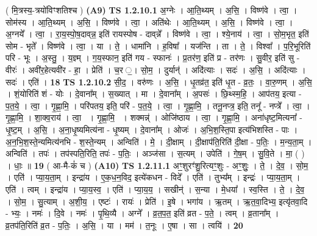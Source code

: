 \documentclass[17pt]{extarticle}
\begin{document}
                  \newline
                      ( मि॒त्रस्य॒-त्रयो॑विꣳशतिश्च )  \textbf{(A9)} \newline \newline
                                \textbf{ TS 1.2.10.1} \newline
                  अ॒ग्नेः । आ॒ति॒थ्यम् । अ॒सि॒ । विष्ण॑वे । त्वा॒ । सोम॑स्य । आ॒ति॒थ्यम् । अ॒सि॒ । विष्ण॑वे । त्वा॒ । अति॑थेः । आ॒ति॒थ्यम् । अ॒सि॒ । विष्ण॑वे । त्वा॒ । अ॒ग्नये᳚ । त्वा॒ । रा॒य॒स्पो॒ष॒दाव्‌न्न॒ इति॑ रायस्पोष - दाव्‌न्ने᳚ । विष्ण॑वे । त्वा॒ । श्ये॒नाय॑ । त्वा॒ । सो॒म॒भृत॒ इति॑ सोम - भृते᳚ । विष्ण॑वे । त्वा॒ । या । ते॒ । धामा॑नि । ह॒विषा᳚ । यज॑न्ति । ता । ते॒ । विश्वा᳚ । प॒रि॒भूरिति॑ परि - भूः । अ॒स्तु॒ । य॒ज्ञ्म् । ग॒य॒स्फान॒ इति॑ गय - स्फानः॑ । प्र॒तर॑ण॒ इति॑ प्र - तर॑णः । सु॒वीर॒ इति॑ सु - वीरः॑ । अवी॑र॒हेत्यवी॑र - हा॒ । प्रेति॑ । च॒र ॒। सो॒म॒ । दुर्यान्॑ । अदि॑त्याः । सदः॑ । अ॒सि॒ । अदि॑त्याः । सदः॑ । एति॑ । \textbf{  18} \newline
                  \newline
                                \textbf{ TS 1.2.10.2} \newline
                  सी॒द॒ । वरु॑णः । अ॒सि॒ । धृ॒तव्र॑त॒ इति॑ धृ॒त - व्र॒तः॒ । वा॒रु॒णम् । अ॒सि॒ । शं॒योरिति॑ शं - योः । दे॒वाना᳚म् । स॒ख्यात् । मा । दे॒वाना᳚म् । अ॒पसः॑ । छि॒थ्स्म॒हि॒ । आप॑तय॒ इत्या - प॒त॒ये॒ । त्वा॒ ।  गृ॒ह्णा॒मि॒ । परि॑पतय॒ इति॒ परि॑ - प॒त॒ये॒ । त्वा॒ । गृ॒ह्णा॒मि॒ । तनू॒नप्त्र॒ इति॒ तनू᳚ - नप्त्रे᳚ । त्वा॒ । गृ॒ह्णा॒मि॒ । शा॒क्व॒राय॑ । त्वा॒  । गृ॒ह्णा॒मि॒  । शक्मन्न्॑ । ओजि॑ष्ठाय । त्वा॒ । गृ॒ह्णा॒मि॒ । अना॑धृष्ट॒मित्यना᳚ - धृ॒ष्ट॒म् । अ॒सि॒ । अ॒ना॒धृ॒ष्यमित्य॑ना - धृ॒ष्यम् । दे॒वाना᳚म् । ओजः॑ । अ॒भि॒श॒स्ति॒पा इत्य॑भिशस्ति - पाः । अ॒न॒भि॒श॒स्ते॒न्यमित्य॑नभि - श॒स्ते॒न्यम् । अन्विति॑ । मे॒ । दी॒क्षाम् । दी॒क्षाप॑ति॒रिति॑ दी॒क्षा - प॒तिः॒ । म॒न्य॒ता॒म् । अन्विति॑ । तपः॑ । तप॑स्पति॒रिति॒ तपः॑ - प॒तिः॒ । अञ्ज॑सा । स॒त्यम् । उपेति॑ । गे॒ष॒म् । सु॒वि॒ते । मा॒ ( ) । धाः॒ ॥ \textbf{  19 } \newline
                  \newline
                      ( आ-मै-कं॑ च )  \textbf{(A10)} \newline \newline
                                \textbf{ TS 1.2.11.1} \newline
                  अꣳ॒॒शुरꣳ॑शु॒रित्यꣳ॒॒शुः - अꣳ॒॒शुः॒ । ते॒ । दे॒व॒ । सो॒म॒ । एति॑ । प्या॒य॒ता॒म् । इन्द्रा॑य । ए॒क॒ध॒न॒विद॒ इत्ये॑कधन - विदे᳚ । एति॑ । तुभ्य᳚म् । इन्द्रः॑ । प्या॒य॒ता॒म् । एति॑ । त्वम् । इन्द्रा॑य । प्या॒य॒स्व॒ । एति॑ । प्या॒य॒य॒ । सखीन्॑ । स॒न्या । मे॒धया᳚ । स्व॒स्ति । ते॒ । दे॒व॒ । सो॒म॒ । सु॒त्याम् । अ॒शी॒य॒ । एष्टः॑ । रायः॑ । प्रेति॑ । इ॒षे । भगा॑य । ऋ॒तम् । ऋ॒त॒वा॒दिभ्य॒ इत्यृ॑तवा॒दि - भ्यः॒ । नमः॑ । दि॒वे । नमः॑ । पृ॒थि॒व्यै । अग्ने᳚ । व्र॒त॒प॒त॒ इति॑ व्रत - प॒ते॒ । त्वम् । व्र॒ताना᳚म् । व्र॒तप॑ति॒रिति॑ व्र॒त - प॒तिः॒ । अ॒सि॒ । या । मम॑ । त॒नूः । ए॒षा । सा । त्वयि॑ । \textbf{  20} \newline
\end{document}
